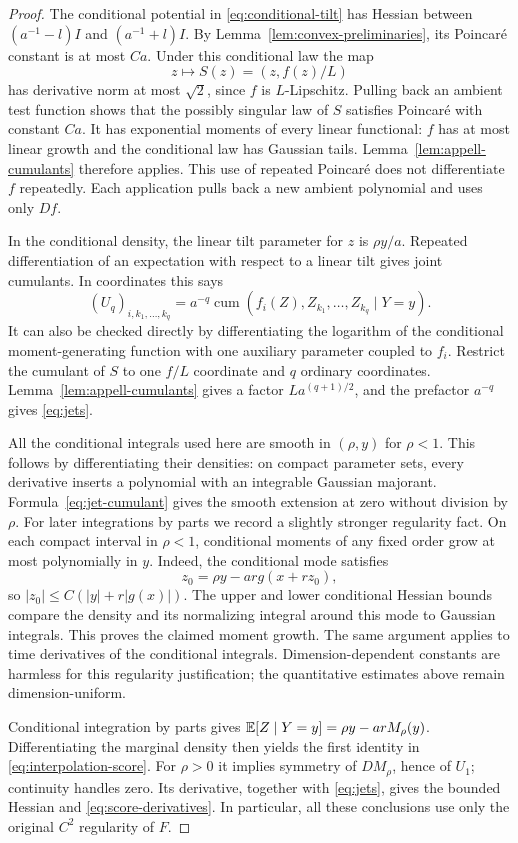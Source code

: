 \begin{proof}
The conditional potential in \eqref{eq:conditional-tilt} has Hessian
between $(a^{-1}-l)I$ and $(a^{-1}+l)I$.  By
Lemma~\ref{lem:convex-preliminaries}, its Poincar\'e constant is at most
$Ca$.  Under this conditional law the map
\[
 z\longmapsto S(z)=(z,f(z)/L)
\]
has derivative norm at most $\sqrt2$, since $f$ is $L$-Lipschitz.
Pulling back an ambient test function shows that the possibly singular
law of $S$ satisfies Poincar\'e with constant $Ca$.  It has exponential
moments of every linear functional: $f$ has at most linear growth and
the conditional law has Gaussian tails.  Lemma~\ref{lem:appell-cumulants}
therefore applies.  This use of repeated Poincar\'e does not differentiate
$f$ repeatedly.  Each application pulls back a new ambient polynomial
and uses only $Df$.

In the conditional density, the linear tilt parameter for $z$ is
$\rho y/a$.  Repeated differentiation of an expectation with respect
to a linear tilt gives joint cumulants.  In coordinates this says
\begin{equation}
 (U_q)_{i,k_1,\ldots,k_q}
 =a^{-q}\operatorname{cum}
       (f_i(Z),Z_{k_1},\ldots,Z_{k_q}\mid Y=y).
 \label{eq:jet-cumulant}
\end{equation}
It can also be checked directly by differentiating the logarithm of the
conditional moment-generating function with one auxiliary parameter
coupled to $f_i$.  Restrict the cumulant of $S$ to one $f/L$ coordinate
and $q$ ordinary coordinates.  Lemma~\ref{lem:appell-cumulants} gives a
factor $L a^{(q+1)/2}$, and the prefactor $a^{-q}$ gives
\eqref{eq:jets}.

All the conditional integrals used here are smooth in $(\rho,y)$ for
$\rho<1$.  This follows by differentiating their densities: on compact
parameter sets, every derivative inserts a polynomial with an integrable
Gaussian majorant.  Formula~\eqref{eq:jet-cumulant} gives the smooth
extension at zero without division by $\rho$.
For later integrations by parts we record a slightly stronger
regularity fact.  On each compact interval in $\rho<1$, conditional
moments of any fixed order grow at most polynomially in $y$.  Indeed,
the conditional mode satisfies
\[
 z_0=\rho y-ar g(x+rz_0),
\]
so $|z_0|\le C(|y|+r|g(x)|)$.  The upper and lower conditional Hessian
bounds compare the density and its normalizing integral around this
mode to Gaussian integrals.  This proves the claimed moment growth.
The same argument applies to time derivatives of the conditional
integrals.  Dimension-dependent constants are harmless for this
regularity justification; the quantitative estimates above remain
dimension-uniform.

Conditional integration by parts gives
$\mathbb E[Z\mid Y=y]=\rho y-arM_\rho(y)$.  Differentiating the marginal
density then yields the first identity in
\eqref{eq:interpolation-score}.  For $\rho>0$ it implies symmetry of
$DM_\rho$, hence of $U_1$; continuity handles zero.  Its derivative,
together with \eqref{eq:jets}, gives the bounded Hessian and
\eqref{eq:score-derivatives}.  In particular, all these conclusions use
only the original $C^2$ regularity of $F$.
\end{proof}

